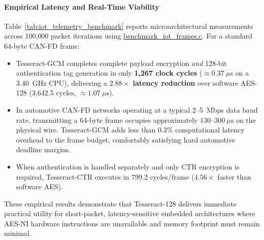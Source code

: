 \documentclass[review,12pt]{elsarticle}
\begin{document}
\begin{table}[htbp]
\caption{Empirical short-packet execution latency across telemetry frame sizes (100,000 iterations, 13th Gen Intel Core @ 3.40~GHz).}
\label{tab:iot_telemetry_benchmark}
\centering
\small
{}
\end{table}

\paragraph{Empirical Latency and Real-Time Viability}
Table~\ref{tab:iot_telemetry_benchmark} reports microarchitectural measurements across 100,000 packet iterations using \url{benchmark_iot_frames.c}. For a standard 64-byte CAN-FD frame:
\begin{itemize}
    \item Tesseract-GCM completes complete payload encryption \emph{and} 128-bit authentication tag generation in only \textbf{1,267 clock cycles} ($\approx 0.37~\mu\text{s}$ on a 3.40~GHz CPU), delivering a \textbf{$2.88\times$ latency reduction} over software AES-128 (3,642.5 cycles, $\approx 1.07~\mu\text{s}$).
    \item In automotive CAN-FD networks operating at a typical 2--5~Mbps data baud rate, transmitting a 64-byte frame occupies approximately $130$--$300~\mu\text{s}$ on the physical wire. Tesseract-GCM adds less than $0.3\%$ computational latency overhead to the frame budget, comfortably satisfying hard automotive deadline margins.
    \item When authentication is handled separately and only CTR encryption is required, Tesseract-CTR executes in 799.2 cycles/frame ($4.56\times$ faster than software AES).
\end{itemize}
These empirical results demonstrate that Tesseract-128 delivers immediate practical utility for short-packet, latency-sensitive embedded architectures where AES-NI hardware instructions are unavailable and memory footprint must remain minimal.
\end{document}
